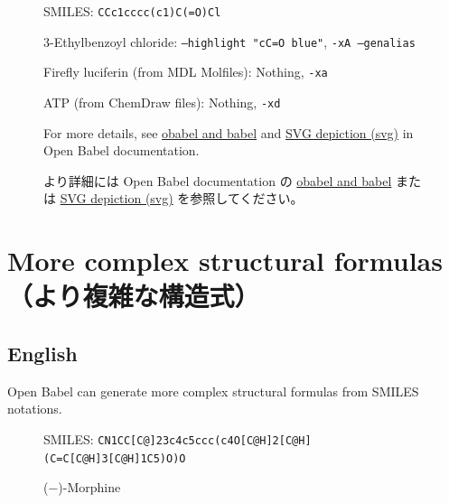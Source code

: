 \documentclass[12pt]{jsarticle}
\begin{document}
\begin{figure}[ht]
  \centering
  \caption{3-Ethylbenzoyl chloride: \texttt{--highlight "cC=O blue"}, \texttt{-xA --genalias}}
  SMILES: \verb|CCc1cccc(c1)C(=O)Cl|
\end{figure}

\begin{figure}[ht]
  \centering
  \caption{Firefly luciferin (from MDL Molfiles): Nothing, \texttt{-xa}}
\end{figure}

\begin{figure}[ht]
  \centering
  \caption{ATP (from ChemDraw files): Nothing, \texttt{-xd}}
\end{figure}

\begin{figure}[ht]
For more details, see \href{http://openbabel.org/docs/dev/Command-line_tools/babel.html}{obabel and babel} and \href{http://openbabel.org/docs/dev/FileFormats/SVG_2D_depiction.html}{SVG depiction (svg)} in Open Babel documentation.

より詳細には Open Babel documentation の \href{http://openbabel.org/docs/dev/Command-line_tools/babel.html}{obabel and babel} または \href{http://openbabel.org/docs/dev/FileFormats/SVG_2D_depiction.html}{SVG depiction (svg)} を参照してください。
\end{figure}

\clearpage

\section{More complex structural formulas （より複雑な構造式）}

\subsection{English}

Open Babel can generate more complex structural formulas from SMILES notations.

\begin{figure}[ht]
  \centering
  \caption{($-$)-Morphine}
  SMILES: \verb|CN1CC[C@]23c4c5ccc(c4O[C@H]2[C@H](C=C[C@H]3[C@H]1C5)O)O|
\end{figure}
\end{document}
